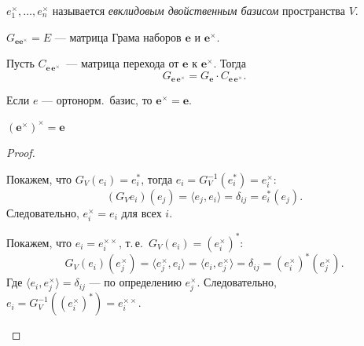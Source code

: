 \begin{definition}
    $e_1^\times, \dots, e_n^\times$ называется \emph{евклидовым двойственным базисом} пространства $V$.

    $G_{\mathbf{e} \mathbf{e^\times}} = E$ — матрица Грама наборов $\mathbf{e}$ и $\mathbf{e^\times}$.
\end{definition}

\begin{remark}
    Пусть $C_{\mathbf{e}\,\mathbf{e}^\times}$~--- матрица перехода от $\mathbf{e}$ к
    $\mathbf{e}^\times$. Тогда
    \[
        G_{\mathbf{e}\,\mathbf{e}^\times} = G_{\mathbf{e}} \cdot C_{\mathbf{e}\,\mathbf{e}^\times}.
    \]
\end{remark}

\begin{proplist}
    \item
    Если $e$ — ортонорм.\ базис, то $\mathbf{e^\times} = \mathbf{e}$.
    \item
    $(\mathbf{e^\times})^\times = \mathbf{e}$
\begin{proof}
    \begin{proofsteps}
        \item Покажем, что $G_V(e_i) = e_i^*$, тогда $e_i = G_V^{-1}(e_i^*) = e_i^\times$:
        \[
            (G_V e_i)(e_j)
            = \langle e_j, e_i \rangle
            = \delta_{ij}
            = e_i^*(e_j).
        \]
        Следовательно, $e_i^\times = e_i$ для всех $i$.

        \item Покажем, что $e_i = e_i^{\times\times}$, т.\,е.\ $G_V(e_i) = (e_i^\times)^*$:
        \[
            G_V(e_i)(e_j^\times)
            = \langle e_j^\times, e_i \rangle
            = \langle e_i, e_j^\times \rangle
            = \delta_{ij}
            = (e_i^\times)^*(e_j^\times).
        \]
        Где $\langle e_i, e_j^\times \rangle = \delta_{ij}$ — по определению $e_j^\times$.
        Следовательно, $e_i = G_V^{-1}((e_i^\times)^*) = e_i^{\times\times}$.
    \end{proofsteps}
\end{proof}

\end{proplist}
